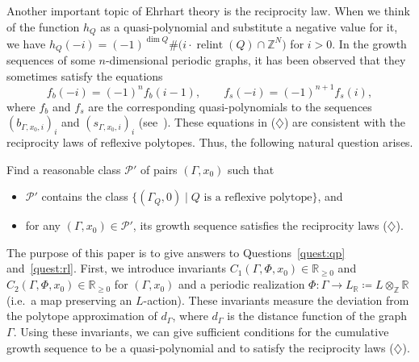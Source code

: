 \documentclass[ALCO,published]{cedram}
\theoremstyle{remark}
\begin{document}
Another important topic of Ehrhart theory is the reciprocity law. 
When we think of the function $h_Q$ as a quasi-polynomial and substitute a negative value for it, 
we have $h_Q(-i) = (-1)^{\dim Q} \# \bigl( i \cdot \operatorname{relint}(Q) \cap \mathbb{Z}^N \bigr)$ for $i > 0$. 
In the growth sequences of some $n$-dimensional periodic graphs, it has been observed that they sometimes satisfy the equations 
\[
f_b(-i) = (-1)^n f_b(i-1), \qquad f_s(-i) = (-1)^{n+1} f_s(i), \tag{$\diamondsuit$}
\]
where $f_b$ and $f_s$ are the corresponding quasi-polynomials to the sequences $(b_{\Gamma, x_0, i})_i$ and $(s_{\Gamma, x_0, i})_i$ (see~\cite{CS97, SM19, Wakatsuki}). 
These equations in ($\diamondsuit$) are consistent with the reciprocity laws of reflexive polytopes. 
Thus, the following natural question arises. 
\begin{quest}\label{quest:rl}
Find a reasonable class $\mathcal{P}'$ of pairs $(\Gamma, x_0)$ such that 
\begin{itemize}
\item 
$\mathcal{P}'$ contains the class $\{ (\Gamma _Q, 0) \mid \text{$Q$ is a reflexive polytope} \}$, and 

\item 
for any $(\Gamma , x_0) \in \mathcal{P}'$, its growth sequence satisfies the reciprocity laws ($\diamondsuit$).
\end{itemize} 
\end{quest}

The purpose of this paper is to give answers to Questions~\ref{quest:qp} and~\ref{quest:rl}. 
First, we introduce invariants $C_1(\Gamma, \Phi, x_0) \in \mathbb{R}_{\ge 0}$ and $C_2(\Gamma, \Phi, x_0) \in \mathbb{R}_{\ge 0}$ for $(\Gamma, x_0)$ and a periodic realization $\Phi\colon \Gamma \to L_{\mathbb{R}} \coloneqq  L \otimes _{\mathbb{Z}} \mathbb{R}$ (i.e.\ a map preserving an $L$-action). 
These invariants measure the deviation from the polytope approximation of $d_{\Gamma}$, where $d_{\Gamma}$ is the distance function of the graph $\Gamma$. 
Using these invariants, we can give sufficient conditions for the cumulative growth sequence to be a quasi-polynomial and to satisfy the reciprocity laws ($\diamondsuit$).
\end{document}
